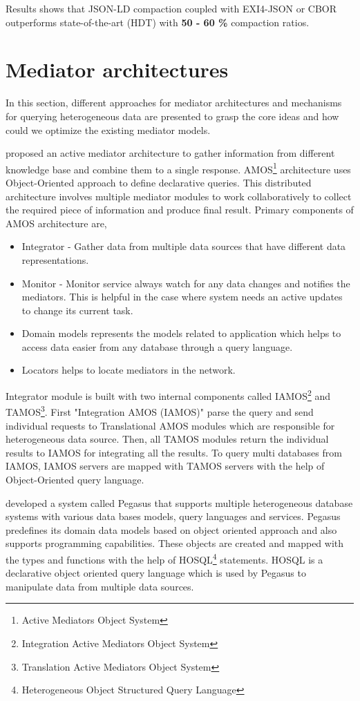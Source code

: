 	Results shows that JSON-LD compaction coupled with EXI4-JSON or CBOR outperforms state-of-the-art (HDT) with \textbf{50 - 60 \% }compaction ratios.
	
	\section{Mediator architectures}
    In this section, different approaches for mediator architectures and mechanisms for querying heterogeneous data are presented to grasp the core ideas and how could we optimize the existing mediator models.
	
	\citet{fahl1993amos} proposed an active mediator architecture to gather information from different knowledge base and combine them to a single response. AMOS\footnote{\label{amos}Active Mediators Object System} architecture uses Object-Oriented approach to define declarative queries. This distributed architecture involves multiple mediator modules to work collaboratively to collect the required piece of information and produce final result. Primary components of AMOS architecture are,
	\begin{itemize}
		\item Integrator - Gather data from multiple data sources that have different data representations.
		\item Monitor - Monitor service always watch for any data changes and notifies the mediators. This is helpful in the case where system needs an active updates to change its current task.
		\item Domain models represents the models related to application which helps to access data easier from any database through a query language.
		\item Locators helps to locate mediators in the network.
	\end{itemize}
	
	
	Integrator module is built with two internal components called IAMOS\footnote{\label{amos}Integration Active Mediators Object System} and TAMOS\footnote{\label{amos}Translation Active Mediators Object System}. 
	First "Integration AMOS (IAMOS)" parse the query and send individual requests to Translational AMOS modules which are responsible for heterogeneous data source.
	Then, all TAMOS modules return the individual results to IAMOS for integrating all the results. To query multi databases from IAMOS, IAMOS servers are mapped with TAMOS servers with the help of Object-Oriented query language.
	
	\citet{ahmed1991pegasus} developed a system called Pegasus that supports multiple heterogeneous database systems with various data bases models, query languages and services. Pegasus predefines its domain data models based on object oriented approach and also supports programming capabilities. These objects are created and mapped with the types and functions with the help of HOSQL\footnote{\label{myfootnote}Heterogeneous Object Structured Query Language} statements. HOSQL is a declarative object oriented query language which is used by Pegasus to manipulate data from multiple data sources.
	
